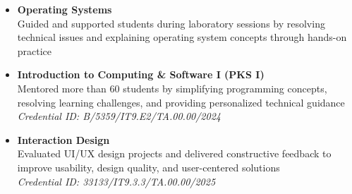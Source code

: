 \begin{itemize}
  \item \textbf{Operating Systems}\\
  Guided and supported students during laboratory sessions by resolving technical issues and explaining operating system concepts through hands-on practice

  \item \textbf{Introduction to Computing \& Software I (PKS I)}\\
 Mentored more than 60 students by simplifying programming concepts, resolving learning challenges, and providing personalized technical guidance\\
  \textit{Credential ID: B/5359/IT9.E2/TA.00.00/2024}

  \item \textbf{Interaction Design}\\
  Evaluated UI/UX design projects and delivered constructive feedback to improve usability, design quality, and user-centered solutions\\
  \textit{Credential ID: 33133/IT9.3.3/TA.00.00/2025}
\end{itemize}

